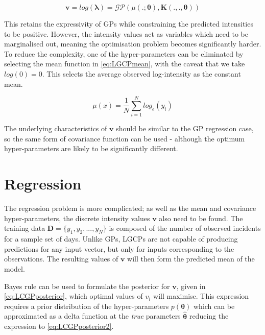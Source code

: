 \documentclass[a4paper,11pt]{report}
\begin{document}
\begin{equation} \label{eq:LGCPsetup}
\mathbf{v} = log(\boldsymbol{\lambda}) = \mathcal{G}\mathcal{P} ( \mu(. ;\boldsymbol{\theta}) , \mathbf{K}(. , . ,\boldsymbol{\theta}))
\end{equation}

This retains the expressivity of GPs while constraining the predicted intensities to be positive. However, the intensity values act as variables which need to be marginalised out, meaning the optimisation problem becomes significantly harder. To reduce the complexity, one of the hyper-parameters can be eliminated by selecting the mean function in \ref{eq:LGCPmean}, with the caveat that we take \(log(0)=0\). This selects the average observed log-intensity as the constant mean. 

\begin{equation} \label{eq:LGCPmean}
\mu (x) = \frac{1}{N} \sum_{i=1}^{N} log_e(y_i)
\end{equation}

The underlying characteristics of \(\mathbf{v}\) should be similar to the GP regression case, so the same form of covariance function can be used - although the optimum hyper-parameters are likely to be significantly different.

\section{Regression}

The regression problem is more complicated; as well as the mean and covariance hyper-parameters, the discrete intensity values \(\mathbf{v}\) also need to be found. The training data \(\mathbf{D} = \{y_1,y_2, ..., y_N\}\) is composed of the number of observed incidents for a sample set of days. Unlike GPs, LGCPs are not capable of producing predictions for any input vector, but only for inputs corresponding to the observations. The resulting values of \(\mathbf{v}\) will then form the predicted mean of the model. \par

Bayes rule can be used to formulate the posterior for \(\mathbf{v}\), given in \ref{eq:LCGPposterior}, which optimal values of \(v_i\) will maximise. This expression requires a prior distribution of the hyper-parameters \(p(\boldsymbol{\theta})\) which can be approximated as a delta function at the \textit{true} parameters \(\hat{\boldsymbol{\theta}}\) reducing the expression to \ref{eq:LCGPposterior2}.

\singlespacing
\end{document}
